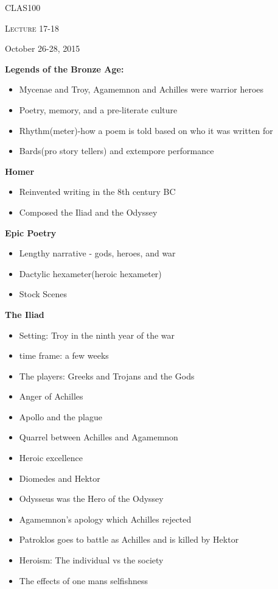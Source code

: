 \documentclass[12pt,a4paper]{report}
\begin{document}
	\centering
	{\scshape\LARGE CLAS100 \par}
	{\scshape\Large Lecture 17-18\par}
	{\large October 26-28, 2015}
	\vspace{1.5cm}

\textbf{Legends of the Bronze Age:}
\begin{itemize}
\item Mycenae and Troy, Agamemnon and Achilles were warrior heroes
\item Poetry, memory, and a pre-literate culture
\item Rhythm(meter)-how a poem is told based on who it was written for
\item Bards(pro story tellers) and extempore performance
\end{itemize}

\textbf{Homer}
\begin{itemize}
\item Reinvented writing in the 8th century BC
\item Composed the Iliad and the Odyssey
\end{itemize}

\textbf{Epic Poetry}
\begin{itemize}
\item Lengthy narrative - gods, heroes, and war
\item Dactylic hexameter(heroic hexameter)
\item Stock Scenes
\end{itemize}

\textbf{The Iliad}
\begin{itemize}
\item Setting: Troy in the ninth year of the war
\item time frame: a few weeks
\item The players: Greeks and Trojans and the Gods
\item Anger of Achilles
\item Apollo and the plague
\item Quarrel between Achilles and Agamemnon
\item Heroic excellence
\item Diomedes and Hektor
\item Odysseus was the Hero of the Odyssey
\item Agamemnon's apology which Achilles rejected
\item Patroklos goes to battle as Achilles and is killed by Hektor
\item Heroism: The individual vs the society
\item The effects of one mans selfishness
\end{itemize}
\end{document}
